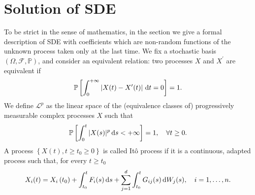 \section{Solution of SDE}
%
%
To be strict in the sense of mathematics, in the section we give a formal description of SDE with coefficients which are non-random functions
of the unknown process taken only at the last time. We fix a stochastic basis $(\Omega, \mathcal{F}, \mathbb{P})$, and consider an equivalent relation: two processes $ X $ and $ X^{\prime} $ are equivalent if
\[ \mathbb{P}\left[\int_{0}^{+\infty}\left|X(t)-X^{\prime}(t)\right| \,\mathrm{d} t=0\right]=1 .\]
We define $ \mathcal{L}^{p}$ as the linear space of the (equivalence classes of) progressively measurable complex processes $X$ such that \[ \mathbb{P}\left[\int_{0}^{t}|X(s)|^{p} \,\mathrm{d} s<+\infty\right]=1, \quad \forall t \geq 0. \]
A process $\left\{X(t), t \geq t_{0} \geq 0\right\}$ is called Itô process if it is a continuous, adapted process such that, for every $t \geq t_{0}$ \[ X_{i}(t)=X_{i}\left(t_{0}\right)+\int_{t_{0}}^{t} F_{i}(s) \,\mathrm{d} s+\sum_{j=1}^{d} \int_{t_{0}}^{t} G_{i j}(s) \,\mathrm{d} W_{j}(s), \quad i=1, \ldots, n. \]
